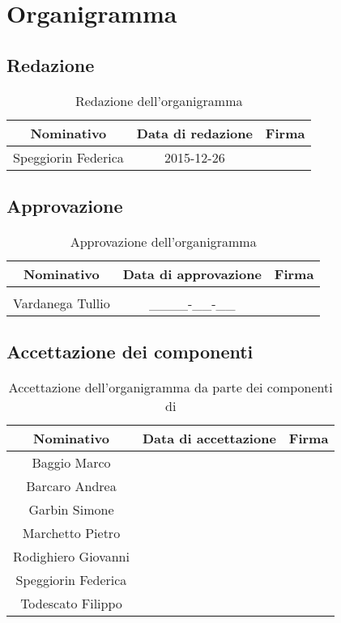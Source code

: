 \appendix

\section{Organigramma}
\subsection{Redazione}

\begin{table}[H]
  \centering
  \begin{tabular}{|c|c|p{4cm}|}
  \hline
  \textbf{Nominativo} &
  \textbf{Data di redazione} &
  \textbf{Firma} \\
  \hline
  Speggiorin Federica & 2015-12-26 &  \\
  \hline
  \end{tabular}
  \caption{Redazione dell'organigramma}
\end{table}

\subsection{Approvazione}

\begin{table}[H]
  \centering
  \begin{tabular}{|c|c|p{4cm}|}
  \hline
  \textbf{Nominativo} &
  \textbf{Data di approvazione} &
  \textbf{Firma} \\
  \hline
   &  &  \\
  \hline
  Vardanega Tullio & \_\_\_\_-\_\_-\_\_ &  \\
  \hline
  \end{tabular}
  \caption{Approvazione dell'organigramma}
\end{table}

\subsection{Accettazione dei componenti}

\begin{table}[H]
  \centering
  \begin{tabular}{|c|c|p{4cm}|}
  \hline
  \textbf{Nominativo} &
  \textbf{Data di accettazione} &
  \textbf{Firma} \\
  \hline
  Baggio Marco &  &  \\
  \hline
  Barcaro Andrea &  &  \\
  \hline
  Garbin Simone &  &  \\
  \hline
  Marchetto Pietro &  &  \\
  \hline
  Rodighiero Giovanni &  &  \\
  \hline
  Speggiorin Federica &  &  \\
  \hline
  Todescato Filippo &  &  \\
  \hline
  \end{tabular}
  \caption{Accettazione dell'organigramma da parte dei componenti di \GroupName{}}
\end{table}


